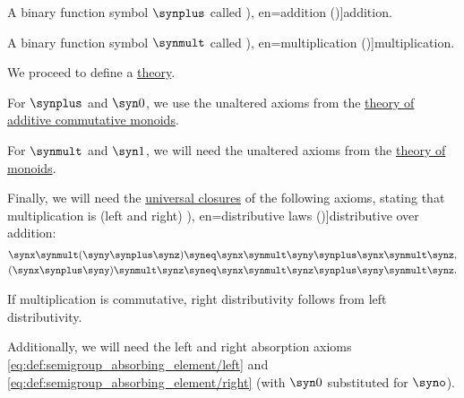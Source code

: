 \begin{definition}
\begin{thmenum}
\begin{thmenum}
\begin{thmenum}
         A binary function symbol \( \synplus \) called \term[ru=сложение (\cite[def. 3.1]{БелоусовТкачёв2004ДискретнаяМатематика}), en=addition (\cite[1]{Golan1999Semirings})]{addition}.

         A binary function symbol \( \synmult \) called \term[ru=умножение (\cite[def. 3.1]{БелоусовТкачёв2004ДискретнаяМатематика}), en=multiplication (\cite[1]{Golan1999Semirings})]{multiplication}.
      \end{thmenum}

       We proceed to define a \hyperref[def:fol_theory]{theory}.
      \begin{thmenum}
         For \( \synplus \) and \( \syn0 \), we use the unaltered axioms from the \hyperref[def:additive_semigroup/theory]{theory of additive commutative monoids}.

         For \( \synmult \) and \( \syn1 \), we will need the unaltered axioms from the \hyperref[def:monoid/theory]{theory of monoids}.

         Finally, we will need the \hyperref[def:fol_quantifier_closure]{universal closures} of the following axioms, stating that multiplication is (left and right) \term[ru=законы дистрибутивности (\cite[83]{Кострикин2020АлгебраЧасть1}), en=distributive laws (\cite[def. 2.1]{Jacobson1985BasicAlgebraI})]{distributive} over addition:
        \begin{align}
          \synx \synmult (\syny \synplus \synz) &\syneq \synx \synmult \syny \synplus \synx \synmult \synz, \label{eq:def:semiring/theory/axioms/distributivity/left} \\
          (\synx \synplus \syny) \synmult \synz &\syneq \synx \synmult \synz \synplus \syny \synmult \synz. \label{eq:def:semiring/theory/axioms/distributivity/right}
        \end{align}

        If multiplication is commutative, right distributivity follows from left distributivity.

         Additionally, we will need the left and right absorption axioms \eqref{eq:def:semigroup_absorbing_element/left} and \eqref{eq:def:semigroup_absorbing_element/right} (with \( \syn0 \) substituted for \( \syno \)).
      \end{thmenum}
    \end{thmenum}


\end{thmenum}
\end{definition}

